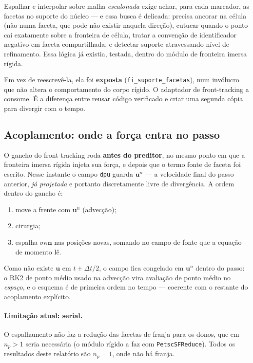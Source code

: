 Espalhar e interpolar sobre malha \emph{escalonada} exige achar, para cada
marcador, as facetas no suporte do n\'ucleo --- e essa busca \'e delicada: precisa
ancorar na c\'elula (n\~ao numa faceta, que pode n\~ao existir naquela
dire\c{c}\~ao), cutucar quando o ponto cai exatamente sobre a fronteira de
c\'elula, tratar a conven\c{c}\~ao de identificador negativo em faceta
compartilhada, e detectar suporte atravessando n\'ivel de refinamento. Essa
l\'ogica j\'a existia, testada, dentro do m\'odulo de fronteira imersa r\'igida.

Em vez de reescrev\^e-la, ela foi \textbf{exposta} (\texttt{fi\_suporte\_facetas}),
num invólucro que n\~ao altera o comportamento do corpo r\'igido. O adaptador de
front-tracking a consome. \'E a diferen\c{c}a entre reusar c\'odigo verificado e
criar uma segunda c\'opia para divergir com o tempo.

\subsection{Acoplamento: onde a for\c{c}a entra no passo}

O gancho do front-tracking roda \textbf{antes do preditor}, no mesmo ponto em que
a fronteira imersa r\'igida injeta sua for\c{c}a, e depois que o termo fonte de
faceta foi escrito. Nesse instante o campo \texttt{dpu} guarda $\mathbf{u}^{n}$ ---
a velocidade final do passo anterior, \emph{j\'a projetada} e portanto
discretamente livre de diverg\^encia. A ordem dentro do gancho \'e:

\begin{enumerate}
  \item move a frente com $\mathbf{u}^{n}$ (advec\c{c}\~ao);
  \item cirurgia;
  \item espalha $\sigma\kappa\mathbf{n}$ nas posi\c{c}\~oes novas, somando no campo
    de fonte que a equa\c{c}\~ao de momento l\^e.
\end{enumerate}

Como n\~ao existe $\mathbf{u}$ em $t+\Delta t/2$, o campo fica congelado em
$\mathbf{u}^{n}$ dentro do passo: o RK2 de ponto m\'edio usado na advec\c{c}\~ao
vira avalia\c{c}\~ao de ponto m\'edio no \emph{espa\c{c}o}, e o esquema \'e de
primeira ordem no tempo --- coerente com o restante do acoplamento expl\'icito.

\paragraph{Limita\c{c}\~ao atual: serial.} O espalhamento n\~ao faz a
redu\c{c}\~ao das facetas de franja para os donos, que em $n_p>1$ seria
necess\'aria (o m\'odulo r\'igido a faz com \texttt{PetscSFReduce}). Todos os
resultados deste relat\'orio s\~ao $n_p=1$, onde n\~ao h\'a franja.
